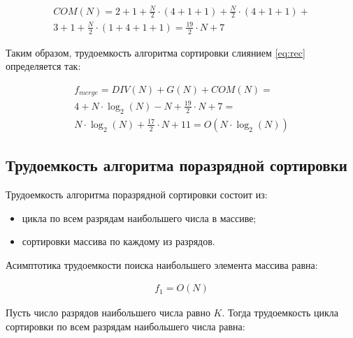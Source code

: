 \begin{enumerate}[label={\arabic*)}]
	\begin{equation}
		\label{eq:com}
		\begin{gathered}
			COM(N) = 2 + 1 + \frac{N}{2} \cdot (4 + 1 + 1) + \frac{N}{2} \cdot (4 + 1 + 1) + \\
			3 + 1 + \frac{N}{2} \cdot (1 + 4 + 1 + 1) = \frac{19}{2} \cdot N + 7
		\end{gathered}
	\end{equation}

	Таким образом, трудоемкость алгоритма сортировки слиянием \ref{eq:rec} определяется так:
	
	\begin{equation}
		\label{eq:merge}
		\begin{gathered}
			f_{merge} = DIV(N) + G(N) + COM(N) = \\
			4 + N \cdot \log_2(N) - N + \frac{19}{2} \cdot N + 7 = \\
			N \cdot \log_2(N) + \frac{17}{2} \cdot N + 11 = O(N \cdot \log_2(N))
		\end{gathered}
	\end{equation}

\end{enumerate}

\subsection{Трудоемкость алгоритма поразрядной сортировки}

Трудоемкость алгоритма поразрядной сортировки состоит из:

\begin{itemize}[label*=--]
	\item цикла по всем разрядам наибольшего числа в массиве;
	\item сортировки массива по каждому из разрядов.
\end{itemize}

\clearpage

Асимптотика трудоемкости поиска наибольшего элемента массива равна:

\begin{equation}
	\label{eq:radixPart1}
	\begin{gathered}
		f_1 = O(N)
	\end{gathered}
\end{equation}

Пусть число разрядов наибольшего числа равно $K$. Тогда трудоемкость цикла сортировки по всем разрядам наибольшего числа равна:

